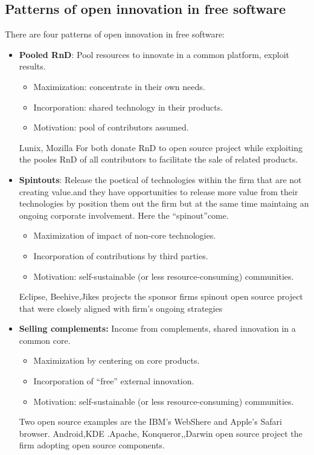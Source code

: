 \subsection* {Patterns of open innovation in free software} \label{Patterns of open innovation in free software}
There are four patterns of open innovation in free software:
\begin{itemize}
 \item  \textbf {Pooled RnD}: Pool resources to innovate in a common platform, exploit results.
  \begin{itemize}
		\item Maximization: concentrate in their own needs.
		\item Incorporation: shared technology in their products.
		\item Motivation: pool of contributors assumed.
	\end{itemize}
Lunix, Mozilla For both donate RnD to open source project while exploiting the pooles RnD of all contributors to facilitate the sale of related products.


 \item  \textbf {Spintouts}: Release the poetical of technologies within the firm that are not creating value.and they have opportunities to release more value from their technologies by position them out the firm but at the same time maintaing an ongoing corporate involvement. Here the “spinout”come.
	\begin{itemize}
		\item Maximization of impact of non-core technologies.
		\item Incorporation of contributions by third parties.
		\item Motivation: self-sustainable (or less resource-consuming) communities.
	\end{itemize}
Eclipse, Beehive,Jikes projects the sponsor firms spinout open source project that were closely aligned with firm’s ongoing strategies

 \item \textbf{Selling complements:} Income from complements, shared innovation in a common core.
	\begin{itemize}
		\item Maximization by centering on core products.
		\item Incorporation of “free” external innovation.
		\item Motivation: self-sustainable (or less resource-consuming) communities.
	\end{itemize}
Two open source examples are the IBM’s WebShere and Apple’s Safari browser.
Android,KDE .Apache, Konqueror,,Darwin open source project the firm adopting open source components.


\end{itemize}
